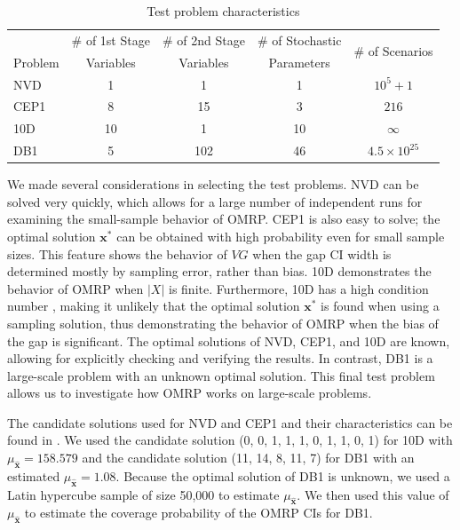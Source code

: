 \documentclass[12pt]{article}
\newcommand{\x}{\mathbf{x}}
\newcommand{\xh}{{\hat{\x}}}
\newcommand{\xs}{\x^*}
\begin{document}
\begin{table}[thb]
\centering
\footnotesize
\begin{tabular}{lcccc}
\hline
& \# of 1st Stage & \# of 2nd Stage & \# of Stochastic & \multirow{2}{*}{\# of Scenarios} \\
Problem & Variables & Variables & Parameters & \\
\cmidrule(r){1-1} \cmidrule(l){2-5}
NVD 	& 1     	& 1     	& 1   	& $10^5 + 1$ \\
CEP1 	& 8     	& 15   	& 3   	& $216$ \\
10D 	& 10     & 1     	& 10   	& $\infty$ \\
DB1 	& 5   	& 102   	& 46   	& $4.5\times 10^{25}$ \\
\hline
\end{tabular}
\caption{Test problem characteristics}
\label{tb:test_problems}
\end{table}



We made several considerations in selecting the test problems.
NVD can be solved very quickly, which allows for a large number of independent runs for examining the small-sample behavior of OMRP.
CEP1 is also easy to solve; the optimal solution $\xs$ can be obtained with high probability even for small sample sizes.
This feature shows the behavior of $VG$ when the gap CI width is determined mostly by sampling error, rather than bias.
10D demonstrates the behavior of OMRP when $|X|$ is finite.
Furthermore, 10D has a high condition number \citep{kleywegt2002sample}, making it unlikely that the optimal solution $\xs$ is found when using a sampling solution, thus demonstrating the behavior of OMRP when the bias of the gap is significant.
The optimal solutions of NVD, CEP1, and 10D are known, allowing for explicitly checking and verifying the results.
In contrast, DB1 is a large-scale problem with an unknown optimal solution.
This final test problem allows us to investigate how OMRP works on large-scale problems.


The candidate solutions used for NVD and CEP1 and their characteristics can be found in \cite{Bayraksan2006}.
We used the candidate solution (0, 0, 1, 1, 1, 0, 1, 1, 0, 1) for 10D with $\mu_{\xh} = 158.579$ and the candidate solution (11, 14, 8, 11, 7) for DB1 with an estimated $\mu_{\xh} = 1.08$. 
Because the optimal solution of DB1 is unknown, we used a Latin hypercube sample of size 50,000 to estimate $\mu_{\xh}$.
We then used this value of $\mu_{\xh}$ to estimate the coverage probability of the OMRP CIs for DB1.
\end{document}
